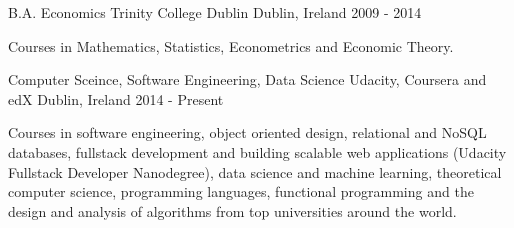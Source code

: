 

\begin{cventries}
  \cventry
    {B.A. Economics}
    {Trinity College Dublin}
    {Dublin, Ireland}
    {2009 - 2014}
    {
      \begin{cvitems}
      \item {Courses in Mathematics, Statistics, Econometrics and Economic Theory.}
      \end{cvitems}
    }
    
  \cventry
    {Computer Sceince, Software Engineering, Data Science}
    {Udacity, Coursera and edX}
    {Dublin, Ireland}
    {2014 - Present}
    {
      \begin{cvitems}
      \item {Courses in software engineering, object oriented design, relational and NoSQL databases, fullstack development and building scalable web applications (Udacity Fullstack Developer Nanodegree), data science and machine learning, theoretical computer science, programming languages, functional programming and the design and analysis of algorithms from top universities around the world.}
      \end{cvitems}
    }
    
  
\end{cventries}



